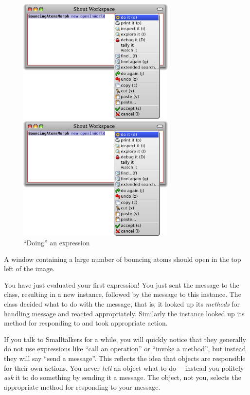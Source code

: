\documentclass[a4paper,10pt,twoside]{book}
\begin{document}
\begin{figure}[htb]
\ifluluelse
	{\centerline {\includegraphics[width=0.7\textwidth]{Doit}}}
	{\centerline {\includegraphics[width=0.7\textwidth]{Doit}}}
\caption{``Doing'' an expression\label{fig:doit}}
\end{figure}

A window containing a large number of bouncing atoms should open in the top left of the \pharo image.

You have just evaluated your first \st expression!
You just sent the message  to the \bam class, resulting in a new \bam instance, followed by the message  to this instance.
The \bam class decided what to do with the  message, that is, it looked up its \emph{methods} for handling  message and reacted appropriately.
Similarly the \bam instance looked up its method for responding to  and took appropriate action.

If you talk to Smalltalkers for a while, you will quickly notice that they generally do not use expressions like ``call an operation'' or ``invoke a method'', but instead they will say ``send a message''.
This reflects the idea that objects are responsible for their own actions. 
You never \emph{tell} an object what to do\,---\,instead you politely \emph{ask} it to do something by sending it a message. 
The object, not you, selects the appropriate method for responding to your message.
\end{document}
